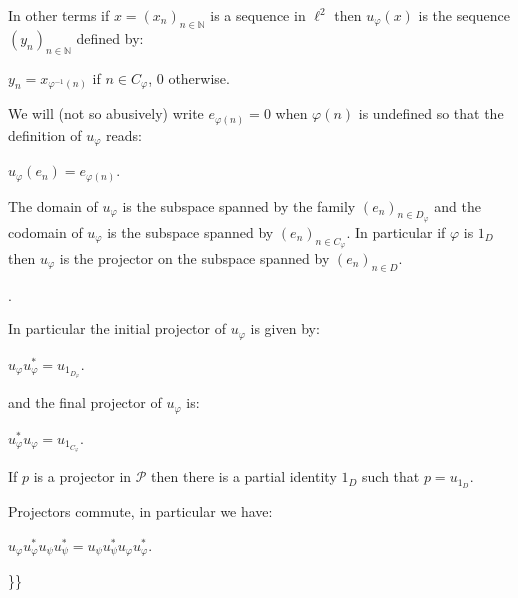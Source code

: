 In other terms if \(x=(x_n)_{n\in\mathbb{N}}\) is a sequence in
\(\ell^2\) then \(u_\varphi(x)\) is the sequence
\((y_n)_{n\in\mathbb{N}}\) defined by:

\begin{description}
\tightlist
\item[]
\(y_n = x_{\varphi^{-1}(n)}\) if \(n\in C_\varphi\), \(0\) otherwise.
\end{description}

We will (not so abusively) write \(e_{\varphi(n)} = 0\) when
\(\varphi(n)\) is undefined so that the definition of \(u_\varphi\)
reads:

\begin{description}
\tightlist
\item[]
\(u_\varphi(e_n) = e_{\varphi(n)}\).
\end{description}

The domain of \(u_\varphi\) is the subspace spanned by the family
\((e_n)_{n\in D_\varphi}\) and the codomain of \(u_\varphi\) is the
subspace spanned by \((e_n)_{n\in C_\varphi}\). In particular if
\(\varphi\) is \(1_D\) then \(u_\varphi\) is the projector on the
subspace spanned by \((e_n)_{n\in D}\).

.

In particular the initial projector of \(u_{\varphi}\) is given by:

\begin{description}
\tightlist
\item[]
\(u_\varphi u^*_\varphi = u_{1_{D_\varphi}}\).
\end{description}

and the final projector of \(u_\varphi\) is:

\begin{description}
\tightlist
\item[]
\(u^*_\varphi u_\varphi = u_{1_{C_\varphi}}\).
\end{description}

If \(p\) is a projector in \(\mathcal{P}\) then there is a partial
identity \(1_D\) such that \(p= u_{1_D}\).

Projectors commute, in particular we have:

\begin{description}
\tightlist
\item[]
\(u_\varphi u_\varphi^*u_\psi u_\psi^* = u_\psi u_\psi^*u_\varphi u_\varphi^*\).
\end{description}

\}\}


